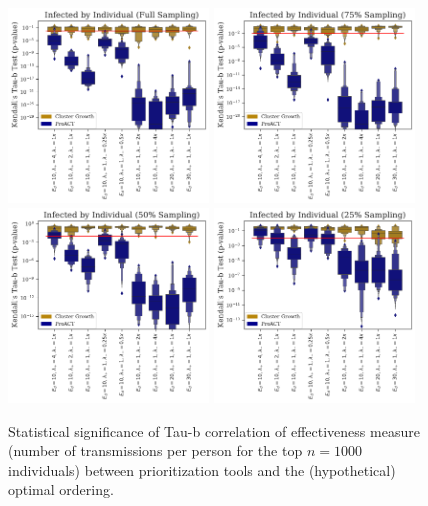 \documentclass[a4paper,11pt]{article}
\begin{document}
\begin{figure}[!h]
\centering
\includegraphics[width=0.475\textwidth]{figs/results_efficacy_tau_pvalue_individual.pdf}
\includegraphics[width=0.475\textwidth]{figs/results_efficacy_tau_pvalue_individual_sub75.pdf}\\
\includegraphics[width=0.475\textwidth]{figs/results_efficacy_tau_pvalue_individual_sub50.pdf}
\includegraphics[width=0.475\textwidth]{figs/results_efficacy_tau_pvalue_individual_sub25.pdf}\\
\caption{{Statistical significance of Tau-b correlation of effectiveness measure (number of transmissions per person for the top $n=1000$ individuals) between prioritization tools and the (hypothetical) optimal ordering.}}\label{fig:tau-b-pvalues}
\end{figure}
\end{document}
